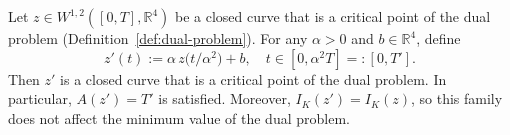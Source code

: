 \begin{lemma}%
\label{lem:dual-scaling-family}
Let $z \in W^{1,2}([0,T], \mathbb{R}^4)$ be a closed curve that is a
critical point of the dual problem (Definition~\ref{def:dual-problem}).
For any $\alpha > 0$ and $b \in \mathbb{R}^4$, define
\begin{equation}\label{eq:scaling-family}
  z'(t) := \alpha\, z\bigl(t/\alpha^2\bigr) + b,
  \quad t \in [0, \alpha^2 T] =: [0, T'].
\end{equation}
Then $z'$ is a closed curve that is a critical point of the dual problem.
In particular, $A(z') = T'$ is satisfied. Moreover, $I_K(z') = I_K(z)$,
so this family does not affect the minimum value of the dual problem.
\end{lemma}

